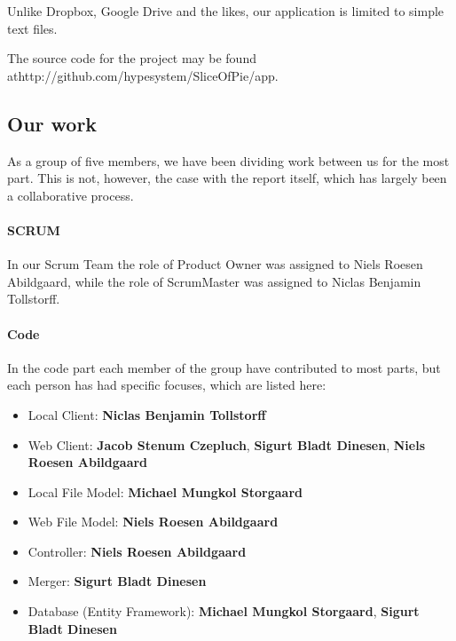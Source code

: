 Unlike Dropbox, Google Drive and the likes, our application is limited to simple text files.

The source code for the project may be found at\newline http://github.com/hypesystem/SliceOfPie/app.

\subsection{Our work}
As a group of five members, we have been dividing work between us for the most part. This is not, however, the case with the report itself, which has largely been a collaborative process.

\paragraph{SCRUM}
In our Scrum Team the role of Product Owner was assigned to Niels Roesen Abildgaard, while the role of ScrumMaster was assigned to Niclas Benjamin Tollstorff.

\paragraph{Code}
In the code part each member of the group have contributed to most parts, but each person has had specific focuses, which are listed here:\\

\begin{itemize}
\item Local Client: \textbf{Niclas Benjamin Tollstorff}
\item Web Client: \textbf{Jacob Stenum Czepluch}, \textbf{Sigurt Bladt Dinesen}, \textbf{Niels Roesen Abildgaard}
\item Local File Model: \textbf{Michael Mungkol Storgaard}
\item Web File Model: \textbf{Niels Roesen Abildgaard}
\item Controller: \textbf{Niels Roesen Abildgaard}
\item Merger: \textbf{Sigurt Bladt Dinesen}
\item Database (Entity Framework): \textbf{Michael Mungkol Storgaard}, \textbf{Sigurt Bladt Dinesen}
\end{itemize}
